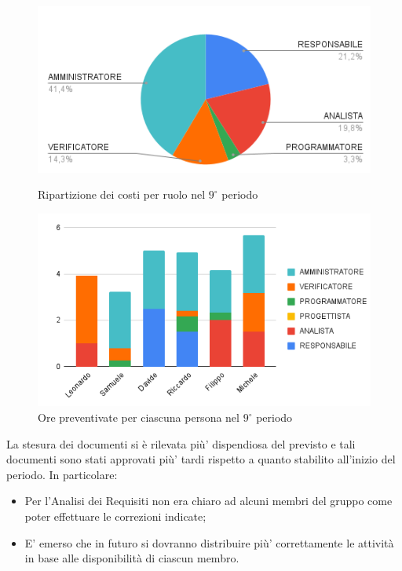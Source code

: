 \begin{figure}[H]
  \centering
  \includegraphics[width=0.6\linewidth]{grafici/9_periodo_torta.png}
  \caption{Ripartizione dei costi per ruolo nel $9^\circ$ periodo}
        \vspace{5mm}
  \includegraphics[width=0.7\linewidth]{grafici/9_periodo_istogramma.png}
  \caption{Ore preventivate per ciascuna persona nel $9^\circ$ periodo}
\end{figure}

La stesura dei documenti si è rilevata più' dispendiosa del previsto e tali documenti sono stati approvati più' tardi rispetto a quanto stabilito all'inizio del periodo. In particolare:
\begin{itemize}
    \item Per l'Analisi dei Requisiti non era chiaro ad alcuni membri del gruppo come poter effettuare le correzioni indicate;
    \item E' emerso che in futuro si dovranno distribuire più' correttamente le attività in base alle disponibilità di ciascun membro.
\end{itemize}